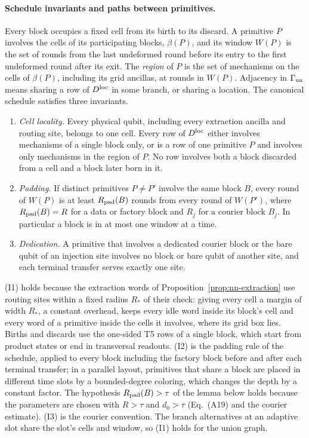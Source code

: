 \documentclass[aps,prx,reprint,superscriptaddress,nofootinbib,floatfix,longbibliography]{revtex4-2}
\theoremstyle{definition}
\begin{document}
\paragraph{Schedule invariants and paths between primitives.}
Every block occupies a fixed cell from its birth to its discard.  A primitive
$P$ involves the cells of its participating blocks, $\beta(P)$, and its window
$W(P)$ is the set of rounds from the last undeformed round before its entry
to the first undeformed round after its exit.  The \emph{region} of $P$ is the
set of mechanisms on the cells of $\beta(P)$, including its grid ancillas, at
rounds in $W(P)$.  Adjacency in $\Gamma_{\rm un}$ means sharing a row of
$D^{\rm loc}$ in some branch, or sharing a location.  The canonical schedule
satisfies three invariants.
\begin{enumerate}
\item[\textup{(I1)}] \emph{Cell locality.}  Every physical qubit, including
every extraction ancilla and routing site, belongs to one cell.  Every row of
$D^{\rm loc}$ either involves mechanisms of a single block only, or is a row of
one primitive $P$ and involves only mechanisms in the region of $P$.  No row
involves both a block discarded from a cell and a block later born in it.
\item[\textup{(I2)}] \emph{Padding.}  If distinct primitives $P\neq P'$
involve the same block $B$, every round of $W(P)$ is at least
$R_{\rm pad}(B)$ rounds from every round of $W(P')$, where
$R_{\rm pad}(B)=R$ for a data or factory block and $R_j$ for a courier block
$B_j$.  In particular a block is in at most one window at a time.
\item[\textup{(I3)}] \emph{Dedication.}  A primitive that involves a dedicated
courier block or the bare qubit of an injection site involves no block or bare
qubit of another site, and each terminal transfer serves exactly one site.
\end{enumerate}
(I1) holds because the extraction words of Proposition~\ref{prop:nn-extraction}
use routing sites within a fixed radius $R_\ast$ of their check: giving every
cell a margin of width $R_\ast$, a constant overhead, keeps every idle word
inside its block's cell and every word of a primitive inside the cells it
involves, where its grid box lies.  Births and discards use the one-sided T5
rows of a single block, which start from product states or end in
transversal readouts.  (I2) is the padding rule of the schedule, applied to
every block including the factory block before and after each terminal
transfer; in a parallel layout, primitives that share a block are placed in
different time slots by a bounded-degree coloring, which changes the depth by
a constant factor.  The hypothesis $R_{\rm pad}(B)>\tau$ of the lemma below
holds because the parameters are chosen with $R>\tau$ and $d_0>\tau$
(Eq.~(A19) and the courier estimate).  (I3) is the courier convention.  The
branch alternatives at an adaptive slot share the slot's cells and window,
so (I1) holds for the union graph.
\end{document}
